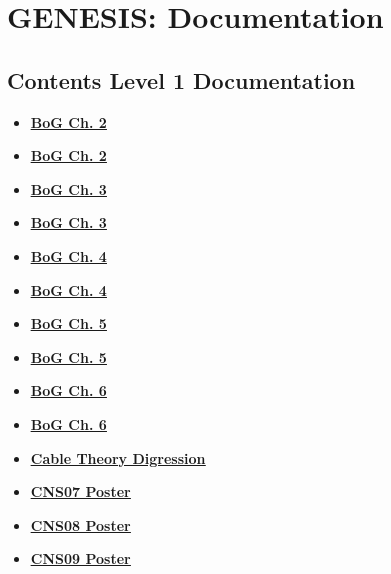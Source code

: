 \documentclass[12pt]{article}
\begin{document}
\section*{GENESIS: Documentation}

\subsection*{Contents Level 1 Documentation}

\begin{itemize}

\item \href{../bog-ch2/bog-ch2.pdf}{\bf \underline{BoG Ch. 2}}

\item \href{../bog-ch2/bog-ch2.pdf}{\bf \underline{BoG Ch. 2}}

\item \href{../bog-ch3/bog-ch3.pdf}{\bf \underline{BoG Ch. 3}}

\item \href{../bog-ch3/bog-ch3.pdf}{\bf \underline{BoG Ch. 3}}

\item \href{../bog-ch4/bog-ch4.pdf}{\bf \underline{BoG Ch. 4}}

\item \href{../bog-ch4/bog-ch4.pdf}{\bf \underline{BoG Ch. 4}}

\item \href{../bog-ch5/bog-ch5.pdf}{\bf \underline{BoG Ch. 5}}

\item \href{../bog-ch5/bog-ch5.pdf}{\bf \underline{BoG Ch. 5}}

\item \href{../bog-ch6/bog-ch6.pdf}{\bf \underline{BoG Ch. 6}}

\item \href{../bog-ch6/bog-ch6.pdf}{\bf \underline{BoG Ch. 6}}

\item \href{../cable-theory-digression/cable-theory-digression.pdf}{\bf \underline{Cable Theory Digression}}

\item \href{../CNS07/CNS07.pdf}{\bf \underline{CNS07 Poster}}

\item \href{../CNS08/CNS08.pdf}{\bf \underline{CNS08 Poster}}

\item \href{../CNS09/CNS09.pdf}{\bf \underline{CNS09 Poster}}


\end{itemize}
\end{document}
